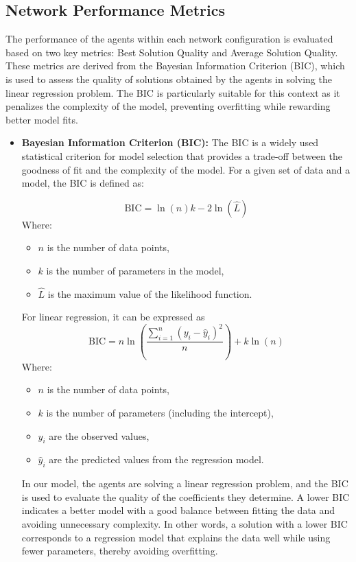 \documentclass[conference]{IEEEtran}
\begin{document}
\subsection{Network Performance Metrics}

The performance of the agents within each network configuration is evaluated based on two key metrics: Best Solution Quality and Average Solution Quality. These metrics are derived from the Bayesian Information Criterion (BIC), which is used to assess the quality of solutions obtained by the agents in solving the linear regression problem. The BIC is particularly suitable for this context as it penalizes the complexity of the model, preventing overfitting while rewarding better model fits.

\begin{itemize}
    \item \textbf{Bayesian Information Criterion (BIC):}
The BIC is a widely used statistical criterion for model selection that provides a trade-off between the goodness of fit and the complexity of the model. For a given set of data and a model, the BIC is defined as:

\begin{equation}
\text{BIC} = \ln(n)k - 2\ln(\hat{L})
\end{equation}
Where:
\begin{itemize}
    \item $n$ is the number of data points,
    \item $k$ is the number of parameters in the model,
    \item $\hat{L}$ is the maximum value of the likelihood function.
\end{itemize}

For linear regression, it can be expressed as
\begin{equation}
\text{BIC} = n \ln\left(\frac{\sum_{i=1}^{n} (y_i - \hat{y}_i)^2}{n}\right) + k \ln(n)
\end{equation}
Where:
\begin{itemize}
    \item $n$ is the number of data points,
    \item $k$ is the number of parameters (including the intercept),
    \item $y_i$ are the observed values,
    \item $\hat{y}_i$ are the predicted values from the regression model.
\end{itemize}

In our model, the agents are solving a linear regression problem, and the BIC is used to evaluate the quality of the coefficients they determine. A lower BIC indicates a better model with a good balance between fitting the data and avoiding unnecessary complexity. In other words, a solution with a lower BIC corresponds to a regression model that explains the data well while using fewer parameters, thereby avoiding overfitting.


\end{itemize}
\end{document}

